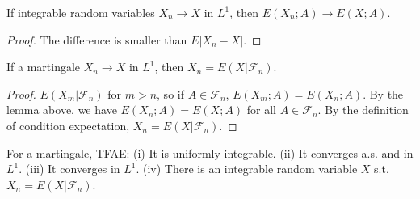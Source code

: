 \begin{lemma}
If integrable random variables $X_n\to X$ in $L^1$, then $E(X_n;A)\to E(X;A)$.
\end{lemma}
\begin{proof}
The difference is smaller than $E\left|X_n-X\right|$.
\end{proof}
\begin{lemma}
If a martingale $X_n\to X$ in $L^1$, then $X_n=E(X|\mathcal{F}_n)$.
\end{lemma}
\begin{proof}
$E(X_m|\mathcal{F}_n)$ for $m>n$, so if $A\in\mathcal{F}_n$, $E(X_m;A)=E(X_n;A)$. By the lemma above, we have $E(X_n;A)=E(X;A)$ for all $A\in\mathcal{F}_n$. By the definition of condition expectation, $X_n=E(X|\mathcal{F}_n)$.
\end{proof}
\begin{theorem}
    For a martingale, TFAE:\newline
    (i) It is uniformly integrable.\newline 
    (ii) It converges a.s. and in $L^1$.\newline 
    (iii) It converges in $L^1$.\newline 
    (iv) There is an integrable random variable $X$ s.t. $X_n=E(X|\mathcal{F}_n)$.
\end{theorem}



